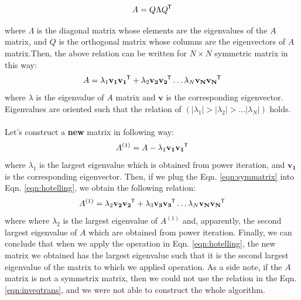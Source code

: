 \documentclass[letterpaper,12pt]{article}
\newcommand*{\tran}{^{\mkern-1.5mu\mathsf{T}}}
\begin{document}
\begin{equation*}
   A = Q \Lambda Q \tran
\end{equation*}

where $\Lambda$ is the diagonal matrix whose elements are the eigenvalues of the $A$ matrix, and $Q$ is the orthogonal matrix whose columns are the eigenvectors of $A$ matrix.Then, the above relation can be written for $N \times N$ symmetric matrix in this way:
\begin{equation}
   \label{eqn:symmatrix}
   A = \lambda_1 \mathbf{v_1} \mathbf{v_1}\tran + \lambda_2 \mathbf{v_2} \mathbf{v_2}\tran \dots \lambda_N \mathbf{v_N} \mathbf{v_N}\tran  
\end{equation}
where $\lambda$ is the eigenvalue of $A$ matrix and $\mathbf{v}$ is the corresponding eigenvector. Eigenvalues are oriented such that the relation of $\left(\left\lvert \lambda_1\right\rvert > \left\lvert \lambda_2\right\rvert > \dots \left\lvert \lambda_N\right\rvert\right)$ holds.

\paragraph{} Let's construct a \textbf{new} matrix in following way:
\begin{equation}
   \label{eqn:hotelling}
   A^{(1)} = A - \lambda_1 \mathbf{v_1}\mathbf{v_1}\tran
\end{equation}
where $\lambda_1$ is the largest eigenvalue which is obtained from power iteration, and $\mathbf{v_1}$ is the corresponding eigenvector. Then, if we plug the Eqn. \ref{eqn:symmatrix} into Eqn. \ref{eqn:hotelling}, we obtain the following relation:
\begin{equation*}
   A^{(1)} = \lambda_2 \mathbf{v_2} \mathbf{v_2}\tran + \lambda_3 \mathbf{v_3} \mathbf{v_3}\tran \dots \lambda_N \mathbf{v_N} \mathbf{v_N}\tran  
\end{equation*}
where where $\lambda_2$ is the largest eigenvalue of $A^{(1)}$ and, apparently, the second largest eigenvalue of $A$ which are obtained from power iteration. Finally, we can conclude that when we apply the operation in Eqn. \ref{eqn:hotelling}, the new matrix we obtained has the largest eigenvalue such that it is the second largest eigenvalue of the matrix to which we applied operation. As a side note, if the $A$ matrix is not a symmetrix matrix, then we could not use the relation in the Eqn. \ref{eqn:inveqtrans}, and we were not able to construct the whole algorithm.
\end{document}
